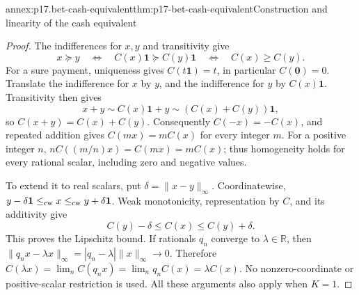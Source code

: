 \begin{annexitem}{annex:p17.bet-cash-equivalent}{thm:p17-bet-cash-equivalent}{Construction and linearity of the cash equivalent}
\begin{proof}
The indifferences for \(x,y\) and transitivity give
\[
 x\succeq y\quad\Longleftrightarrow\quad
 C(x)\mathbf1\succeq C(y)\mathbf1
 \quad\Longleftrightarrow\quad C(x)\geq C(y).
\]
For a sure payment, uniqueness gives \(C(t\mathbf1)=t\), in
particular \(C(\mathbf0)=0\). Translate the indifference for
\(x\) by \(y\), and the indifference for \(y\) by
\(C(x)\mathbf1\). Transitivity then gives
\[
 x+y\sim C(x)\mathbf1+y
             \sim(C(x)+C(y))\mathbf1,
\]
so \(C(x+y)=C(x)+C(y)\). Consequently \(C(-x)=-C(x)\),
and repeated addition gives \(C(mx)=mC(x)\) for every integer
\(m\). For a positive integer \(n\),
\(nC((m/n)x)=C(mx)=mC(x)\); thus homogeneity holds for every
rational scalar, including zero and negative values.

To extend it to real scalars, put \(\delta=\|x-y\|_\infty\).
Coordinatewise,
\(y-\delta\mathbf1\leq_{\rm cw}x\leq_{\rm cw}y+\delta\mathbf1\).
Weak monotonicity, representation by \(C\), and its additivity give
\[
                         C(y)-\delta\leq C(x)\leq C(y)+\delta.
\]
This proves the Lipschitz bound. If rationals \(q_n\) converge to
\(\lambda\in\mathbb R\), then
\(\|q_nx-\lambda x\|_\infty=|q_n-\lambda|\|x\|_\infty\to0\).
Therefore \(C(\lambda x)=\lim_n C(q_nx)
=\lim_n q_n C(x)=\lambda C(x)\). No nonzero-coordinate or positive-scalar
restriction is used. All these arguments also apply when \(K=1\).
\end{proof}
\end{annexitem}

